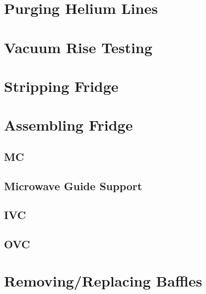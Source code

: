 \section{Purging Helium Lines}

\section{Vacuum Rise Testing}

\section{Stripping Fridge}

\section{Assembling Fridge}

  \subsection{MC}
  \subsection{Microwave Guide Support}
  \subsection{IVC}
  \subsection{OVC}

\section{Removing/Replacing \het{} Baffles}